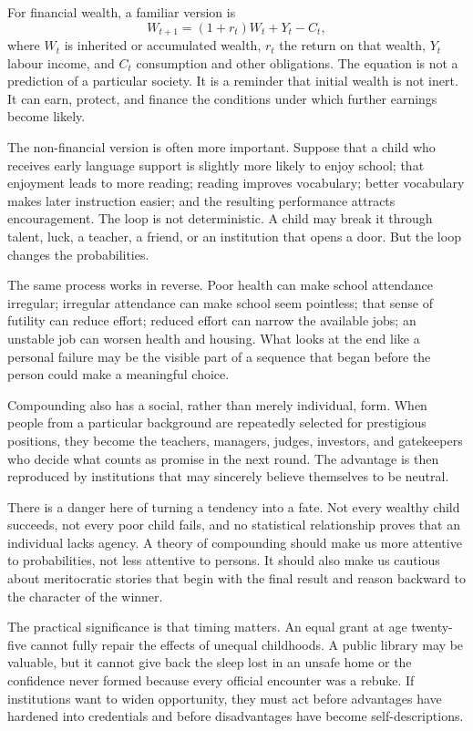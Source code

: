 ﻿\documentclass[12pt,a4paper]{book}
\begin{document}
For financial wealth, a familiar version is
\begin{equation}
  W_{t+1} = (1+r_t)W_t + Y_t - C_t,
  \label{eq:wealth-recurrence}
\end{equation}
where $W_t$ is inherited or accumulated wealth, $r_t$ the return on that
wealth, $Y_t$ labour income, and $C_t$ consumption and other obligations.
The equation is not a prediction of a particular society. It is a reminder
that initial wealth is not inert. It can earn, protect, and finance the
conditions under which further earnings become likely.

The non-financial version is often more important. Suppose that a child who
receives early language support is slightly more likely to enjoy school;
that enjoyment leads to more reading; reading improves vocabulary; better
vocabulary makes later instruction easier; and the resulting performance
attracts encouragement.  The loop is not deterministic.  A child may break
it through talent, luck, a teacher, a friend, or an institution that opens a
door.  But the loop changes the probabilities.

The same process works in reverse.  Poor health can make school attendance
irregular; irregular attendance can make school seem pointless; that sense
of futility can reduce effort; reduced effort can narrow the available jobs;
an unstable job can worsen health and housing.  What looks at the end like a
personal failure may be the visible part of a sequence that began before
the person could make a meaningful choice.

Compounding also has a social, rather than merely individual, form.  When
people from a particular background are repeatedly selected for prestigious
positions, they become the teachers, managers, judges, investors, and
gatekeepers who decide what counts as promise in the next round.  The
advantage is then reproduced by institutions that may sincerely believe
themselves to be neutral.

There is a danger here of turning a tendency into a fate.  Not every wealthy
child succeeds, not every poor child fails, and no statistical relationship
proves that an individual lacks agency.  A theory of compounding should
make us more attentive to probabilities, not less attentive to persons.  It
should also make us cautious about meritocratic stories that begin with the
final result and reason backward to the character of the winner.

The practical significance is that timing matters.  An equal grant at age
twenty-five cannot fully repair the effects of unequal childhoods.  A public
library may be valuable, but it cannot give back the sleep lost in an unsafe
home or the confidence never formed because every official encounter was a
rebuke.  If institutions want to widen opportunity, they must act before
advantages have hardened into credentials and before disadvantages have
become self-descriptions.
\end{document}

